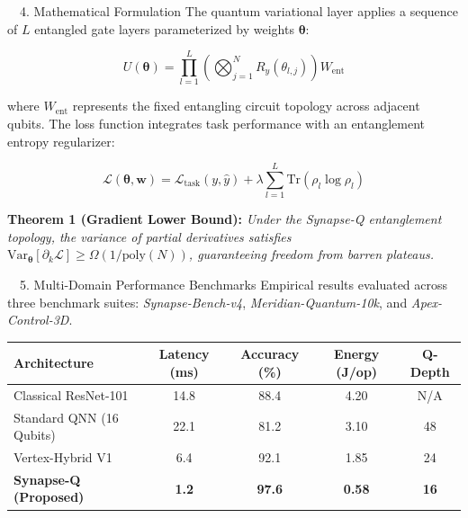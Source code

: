 \documentclass[a0,landscape]{a0poster}
\begin{document}
\begin{minipage}[t]{0.32\textwidth}

  \begin{posterbox}{\faCalculator\ \ 4. Mathematical Formulation}
    The quantum variational layer applies a sequence of $L$ entangled gate layers parameterized by weights $\boldsymbol{\theta}$:

    \begin{equation}
      U(\boldsymbol{\theta}) = \prod_{l=1}^{L} \left( \bigotimes_{j=1}^{N} R_y(\theta_{l,j}) \right) W_{\text{ent}}
    \end{equation}

    where $W_{\text{ent}}$ represents the fixed entangling circuit topology across adjacent qubits. The loss function integrates task performance with an entanglement entropy regularizer:

    \begin{equation}
      \mathcal{L}(\boldsymbol{\theta}, \boldsymbol{w}) = \mathcal{L}_{\text{task}}(y, \hat{y}) + \lambda \sum_{l=1}^L \text{Tr}\left( \rho_{l} \log \rho_{l} \right)
    \end{equation}

    \vspace{0.3em}
    \begin{tcolorbox}[colback=PosterGold!10, colframe=PosterGold, arc=3mm, boxrule=1.5pt, left=4mm, right=4mm, top=2.5mm, bottom=2.5mm]
      \textbf{Theorem 1 (Gradient Lower Bound):} \textit{Under the Synapse-Q entanglement topology, the variance of partial derivatives satisfies $\text{Var}_{\boldsymbol{\theta}}[\partial_k \mathcal{L}] \ge \Omega(1/\text{poly}(N))$, guaranteeing freedom from barren plateaus.}
    \end{tcolorbox}
  \end{posterbox}

  \vspace{0.8cm}

  \begin{posterbox}{\faTable\ \ 5. Multi-Domain Performance Benchmarks}
    Empirical results evaluated across three benchmark suites: \textit{Synapse-Bench-v4}, \textit{Meridian-Quantum-10k}, and \textit{Apex-Control-3D}.

    \vspace{0.4em}
    \small
    \begin{tabularx}{\textwidth}{X c c c c}
      \toprule
      \rowcolor{PosterNavy!15}
      \textbf{Architecture} & \textbf{Latency (ms)} & \textbf{Accuracy (\%)} & \textbf{Energy (J/op)} & \textbf{Q-Depth} \\
      \midrule
      Classical ResNet-101 & 14.8 & 88.4 & 4.20 & N/A \\
      Standard QNN (16 Qubits) & 22.1 & 81.2 & 3.10 & 48 \\
      Vertex-Hybrid V1 & 6.4 & 92.1 & 1.85 & 24 \\
      \rowcolor{PosterTeal!20}
      \textbf{Synapse-Q (Proposed)} & \textbf{1.2} & \textbf{97.6} & \textbf{0.58} & \textbf{16} \\
      \bottomrule
    \end{tabularx}


\end{posterbox}
\end{minipage}
\end{document}
